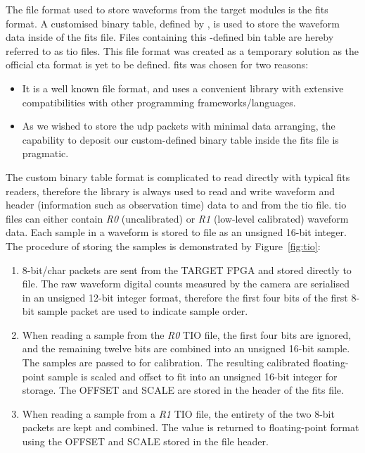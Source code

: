 \noindent The file format used to store waveforms from the \gls{target} modules is the \gls{fits} format. A customised binary table, defined by , is used to store the waveform data inside of the \gls{fits} file. Files containing this -defined bin table are hereby referred to as \gls{tio} files. This file format was created as a temporary solution as the official \gls{cta} format is yet to be defined. \gls{fits} was chosen for two reasons:
\begin{itemize}
\item It is a well known file format, and uses a convenient library with extensive compatibilities with other programming frameworks/languages.
\item As we wished to store the \gls{udp} packets with minimal data arranging, the capability to deposit our custom-defined binary table inside the \gls{fits} file is pragmatic.
\end{itemize}
The custom binary table format is complicated to read directly with typical \gls{fits} readers, therefore the  library is always used to read and write waveform and header (information such as observation time) data to and from the \gls{tio} file. \gls{tio} files can either contain \textit{R0} (uncalibrated)  or \textit{R1} (low-level calibrated) waveform data. Each sample in a waveform is stored to file as an unsigned 16-bit integer. The procedure of storing the samples is demonstrated by Figure~\ref{fig:tio}:
\begin{enumerate}[label={\arabic*)}]
	\item 8-bit/char packets are sent from the TARGET FPGA and stored directly to file. The raw waveform digital counts measured by the camera are serialised in an unsigned 12-bit integer format, therefore the first four bits of the first 8-bit sample packet are used to indicate sample order.
  	\item When reading a sample from the \textit{R0} TIO file, the first four bits are ignored, and the remaining twelve bits are combined into an unsigned 16-bit sample. The samples are passed to  for calibration. The resulting calibrated floating-point sample is scaled and offset to fit into an unsigned 16-bit integer for storage. The OFFSET and SCALE are stored in the header of the \gls{fits} file.
  	\item When reading a sample from a \textit{R1} TIO file, the entirety of the two 8-bit packets are kept and combined. The value is returned to floating-point format using the OFFSET and SCALE stored in the file header.
\end{enumerate}

